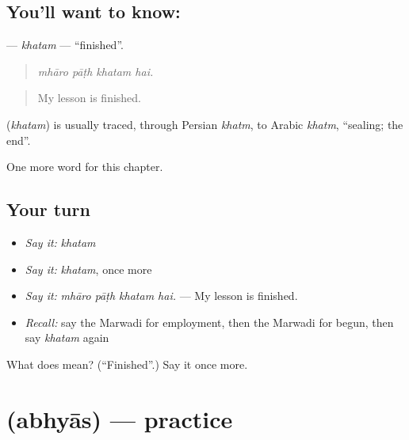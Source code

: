 \subsection*{You'll want to know: }
\textbf{} — \emph{khatam} — \textquotedblleft{}finished\textquotedblright{}.

\begin{quote}
   
\end{quote}

\begin{quote}
\emph{mhāro pāṭh khatam hai.}
\end{quote}

\begin{quote}
My lesson is finished.
\end{quote}

\begin{cousinweb}
\textbf{} (\emph{khatam}) is usually traced, through Persian \emph{khatm}, to Arabic \emph{khatm}, \textquotedblleft{}sealing; the end\textquotedblright{}.
\end{cousinweb}

\begin{grammarlens}[title={What you've built}]
One more word for this chapter.
\end{grammarlens}

\subsection*{Your turn}
\begin{itemize}
\raggedright
  \item \emph{Say it:} \emph{khatam}
  \item \emph{Say it:} \emph{khatam}, once more
  \item \emph{Say it:} \emph{mhāro pāṭh khatam hai.} — My lesson is finished.
  \item \emph{Recall:} say the Marwadi for employment, then the Marwadi for begun, then say \emph{khatam} again
\end{itemize}

\begin{tcolorbox}[breakable,colback=teal!4,colframe=teal!35!black,title={Before you move on}]
What does  mean? (\textquotedblleft{}Finished\textquotedblright{}.) Say it once more.
\end{tcolorbox}
\section[\texorpdfstring{\mw{अभ्यास} (abhyās)}{अभ्यास (abhyās)}]{ (abhyās) — practice}

